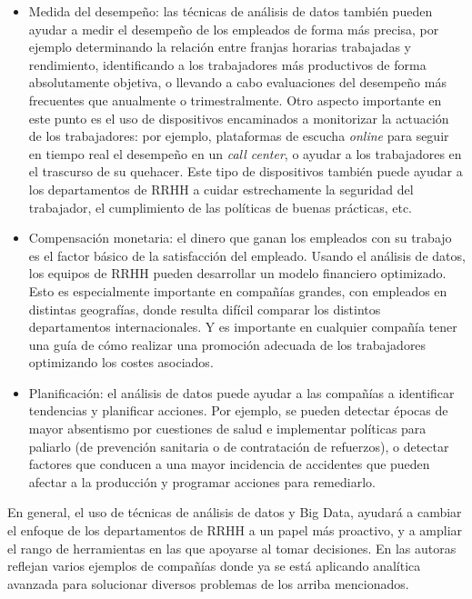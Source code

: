 \begin{itemize}
\item Medida del desempeño: las técnicas de análisis de datos también pueden ayudar a medir
el desempeño de los empleados de forma más precisa, por ejemplo determinando la relación entre 
franjas horarias trabajadas y rendimiento, identificando a los trabajadores más productivos de
forma absolutamente objetiva, o llevando a cabo evaluaciones del desempeño
más frecuentes que anualmente o trimestralmente. Otro aspecto importante en este punto es el uso de dispositivos 
encaminados a monitorizar la actuación de los trabajadores: por ejemplo, plataformas de escucha 
{\em online} para seguir en tiempo real el desempeño en un {\em call center}, o ayudar a los trabajadores
en el trascurso de su quehacer. Este tipo de dispositivos también puede ayudar a los departamentos
de RRHH a cuidar estrechamente la seguridad del trabajador, el cumplimiento de las políticas
de buenas prácticas, etc.

\item Compensación monetaria: el dinero que ganan los empleados con su trabajo es el
factor básico de la satisfacción del empleado. Usando el análisis de datos, los equipos de 
RRHH pueden desarrollar un modelo financiero optimizado. Esto es especialmente importante
en compañías grandes, con empleados en distintas geografías, donde resulta difícil comparar 
los distintos departamentos internacionales. Y es importante en cualquier compañía tener
una guía de cómo realizar una promoción adecuada de los trabajadores optimizando
los costes asociados.

\item Planificación: el análisis de datos puede ayudar a las compañías a identificar tendencias y 
planificar acciones. Por ejemplo, se pueden detectar épocas de mayor absentismo por cuestiones de 
salud e implementar políticas para paliarlo (de prevención sanitaria o de contratación de refuerzos), o 
detectar factores que conducen a una mayor incidencia de accidentes que pueden afectar a la producción
y programar acciones para remediarlo.

\end{itemize}

En general, el uso de técnicas de análisis de datos y Big Data, ayudará a cambiar el enfoque
de los departamentos de RRHH a un papel más proactivo, y a ampliar el rango de herramientas en las
que apoyarse al tomar decisiones. En \cite{talent_an} las autoras reflejan varios ejemplos
de compañías donde ya se está aplicando analítica avanzada para solucionar diversos problemas
de los arriba mencionados.

